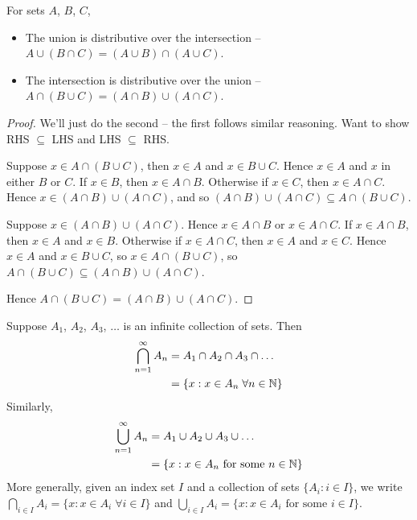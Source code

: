 \documentclass{../../template/note}
\begin{document}
    \begin{proposition}
        For sets \(A\), \(B\), \(C\),
        \begin{itemize}
            \item The union is distributive over the intersection -- \(A \cup (B \cap C) = (A \cup B) \cap (A \cup C)\).
            \item The intersection is distributive over the union -- \(A \cap (B \cup C) = (A \cap B) \cup (A \cap C)\).
        \end{itemize}        
    \end{proposition}
    
    

    \begin{proof}
        We'll just do the second -- the first follows similar reasoning. Want to show RHS \(\subseteq\) LHS and LHS \(\subseteq\) RHS.

        Suppose \(x \in A \cap (B \cup C)\), then \(x \in A\) and \(x \in B \cup C\). Hence \(x \in A\) and \(x\) in either \(B\) or \(C\). If \(x \in B\), then \(x \in A \cap B\). Otherwise if \(x \in C\), then \(x \in A \cap C\). Hence \(x \in (A \cap B) \cup (A \cap C)\), and so \((A \cap B) \cup (A \cap C) \subseteq A \cap (B \cup C)\).

        Suppose \(x \in (A \cap B) \cup (A \cap C)\). Hence \(x \in A \cap B\) or \(x \in A \cap C\). If \(x \in A \cap B\), then \(x \in A\) and \(x \in B\). Otherwise if \(x \in A \cap C\), then \(x \in A\) and \(x \in C\). Hence \(x \in A\) and \(x \in B \cup C\), so \(x \in A \cap (B \cup C)\), so \(A \cap (B \cup C) \subseteq (A \cap B) \cup (A \cap C)\).

        Hence \(A \cap (B \cup C) = (A \cap B) \cup (A \cap C)\).
    \end{proof}
    
    \begin{definition}
        Suppose \(A_1\), \(A_2\), \(A_3\), \(\dots\) is an infinite collection of sets. Then
        \begin{align*}
            \bigcap_{n=1}^\infty A_n &= A_1 \cap A_2 \cap A_3 \cap \dots \\
            &= \{x: x \in A_n \; \forall n \in \mathbb N\}
        \end{align*}
        Similarly,
        \begin{align*}
            \bigcup_{n=1}^\infty A_n &= A_1 \cup A_2 \cup A_3 \cup \dots \\
            &= \{x: x \in A_n \text{ for some } n \in \mathbb N\}
        \end{align*}
        More generally, given an index set \(I\) and a collection of sets \(\{A_i: i \in I\}\), we write \(\bigcap_{i \in I}A_i = \{x:x \in A_i \; \forall i \in I\}\) and \(\bigcup_{i \in I}A_i = \{x: x \in A_i \text{ for some } i \in I\}\).
    \end{definition}
    
\end{document}
